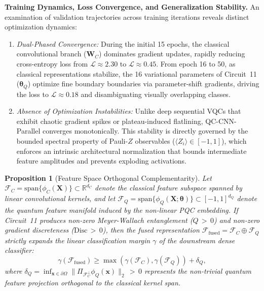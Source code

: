 \documentclass[pdflatex,sn-mathphys-num]{sn-jnl}%
\theoremstyle{thmstyleone}%
\newtheorem{proposition}[theorem]{Proposition}%
\theoremstyle{thmstyletwo}%
\theoremstyle{thmstylethree}%
\begin{document}
\textbf{Training Dynamics, Loss Convergence, and Generalization Stability.} 
An examination of validation trajectories across training iterations reveals distinct optimization dynamics:
\begin{enumerate}
    \item \textit{Dual-Phased Convergence:} During the initial 15 epochs, the classical convolutional branch ($\mathbf{W}_C$) dominates gradient updates, rapidly reducing cross-entropy loss from $\mathcal{L} \approx 2.30$ to $\mathcal{L} \approx 0.45$. From epoch 16 to 50, as classical representations stabilize, the 16 variational parameters of Circuit~11 ($\boldsymbol{\theta}_Q$) optimize fine boundary boundaries via parameter-shift gradients, driving the loss to $\mathcal{L} \approx 0.18$ and disambiguating visually overlapping classes.
    \item \textit{Absence of Optimization Instabilities:} Unlike deep sequential VQCs that exhibit chaotic gradient spikes or plateau-induced flatlining, QC-CNN-Parallel converges monotonically. This stability is directly governed by the bounded spectral property of Pauli-$Z$ observables ($\langle Z_i \rangle \in [-1, 1]$), which enforces an intrinsic architectural normalization that bounds intermediate feature amplitudes and prevents exploding activations.
\end{enumerate}

\begin{proposition}[Feature Space Orthogonal Complementarity]
\label{prop:feature_complementarity}
Let $\mathcal{F}_C = \mathrm{span}\{\phi_C(\mathbf{X})\} \subset \mathbb{R}^{d_C}$ denote the classical feature subspace spanned by linear convolutional kernels, and let $\mathcal{F}_Q = \mathrm{span}\{\phi_Q(\mathbf{X}; \boldsymbol{\theta})\} \subset [-1, 1]^{d_Q}$ denote the quantum feature manifold induced by the non-linear PQC embedding. If Circuit~11 produces non-zero Meyer-Wallach entanglement ($Q \,{>}\, 0$) and non-zero gradient discreteness ($\mathrm{Disc} \,{>}\, 0$), then the fused representation $\mathcal{F}_{\mathrm{fused}} = \mathcal{F}_C \oplus \mathcal{F}_Q$ strictly expands the linear classification margin $\gamma$ of the downstream dense classifier:
\begin{equation}
\gamma(\mathcal{F}_{\mathrm{fused}}) \ge \max\left( \gamma(\mathcal{F}_C), \gamma(\mathcal{F}_Q) \right) + \delta_Q,
\label{eq:margin_expansion}
\end{equation}
where $\delta_Q = \inf_{\mathbf{x} \in \partial \Omega} \|\Pi_{\mathcal{F}_C^\perp} \phi_Q(\mathbf{x})\|_2 \,{>}\, 0$ represents the non-trivial quantum feature projection orthogonal to the classical kernel span.
\end{proposition}
\end{document}
